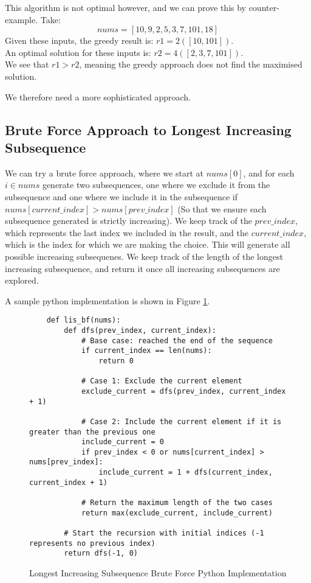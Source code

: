 This algorithm is not optimal however, and we can prove this by counter-example.
Take:$$nums = [10,9,2,5,3,7,101,18]$$
Given these inputs, the greedy result is: $r1 = 2  ([10,101])$.\\
An optimal solution for these inputs is: $r2 = 4 ([2,3,7,101])$.\\
We see that $r1 > r2$, meaning the greedy approach does not find the maximised solution.

We therefore need a more sophisticated approach.

\subsection{Brute Force Approach to Longest Increasing Subsequence}

We can try a brute force approach, where we start at $nums[0]$, and for each $i \in nums$ generate two subsequences,
one where we  exclude it from the subsequence and one where we include it in the subsequence if
$nums[current\_index] > nums[prev\_index]$ (So that we ensure each subsequence generated is strictly increasing).
We keep track of the $prev\_index$, which represents the last index we included in the result,
and the $current\_index$, which is the index for which we are making the choice.
This will generate all possible increasing subsequenes.
We keep track of the length of the longest increasing subsequence, and return it once all increasing subsequences are explored.

A sample python implementation is shown in Figure \ref{fig:lis-bf}.

\begin{figure}[H]
    \centering
    \begin{lstlisting}
    def lis_bf(nums):
        def dfs(prev_index, current_index):
            # Base case: reached the end of the sequence
            if current_index == len(nums):
                return 0
    
            # Case 1: Exclude the current element
            exclude_current = dfs(prev_index, current_index + 1)
    
            # Case 2: Include the current element if it is greater than the previous one
            include_current = 0
            if prev_index < 0 or nums[current_index] > nums[prev_index]:
                include_current = 1 + dfs(current_index, current_index + 1)
    
            # Return the maximum length of the two cases
            return max(exclude_current, include_current)
    
        # Start the recursion with initial indices (-1 represents no previous index)
        return dfs(-1, 0)
    \end{lstlisting}
    \caption{Longest Increasing Subsequence Brute Force Python Implementation}
    \label{fig:lis-bf}
\end{figure}

